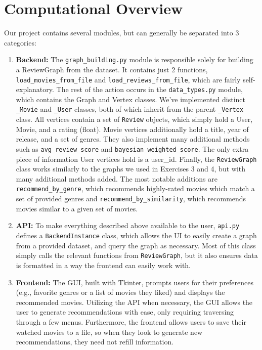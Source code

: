 \documentclass[12pt]{article}
\begin{document}
\section{Computational Overview}
Our project contains several modules, but can generally be separated into 3 categories:
\begin{enumerate}
    \item \textbf{Backend:} The \texttt{graph\_building.py} module is responsible solely for building a ReviewGraph from the dataset. It contains just 2 functions, \texttt{load\_movies\_from\_file} and \texttt{load\_reviews\_from\_file}, which are fairly self-explanatory. The rest of the action occurs in the \texttt{data\_types.py} module, which contains the Graph and Vertex classes. We've implemented distinct \texttt{\_Movie} and \texttt{\_User} classes, both of which inherit from the parent \texttt{\_Vertex} class. All vertices contain a set of \texttt{Review} objects, which simply hold a User, Movie, and a rating (float). Movie vertices additionally hold a title, year of release, and a set of genres. They also implement many additional methods such as \texttt{avg\_review\_score} and  \texttt{bayesian\_weighted\_score}. The only extra piece of information User vertices hold is a user\_id. Finally, the \texttt{ReviewGraph} class works similarly to the graphs we used in Exercises 3 and 4, but with many additional methods added. The most notable additions are \texttt{recommend\_by\_genre}, which recommends highly-rated movies which match a set of provided genres and \texttt{recommend\_by\_similarity}, which recommends movies similar to a given set of movies.
    \item \textbf{API:} To make everything described above available to the user, \texttt{api.py} defines a \texttt{BackendInstance} class, which allows the UI to easily create a graph from a provided dataset, and query the graph as necessary. Most of this class simply calls the relevant functions from \texttt{ReviewGraph}, but it also ensures data is formatted in a way the frontend can easily work with.
    \item \textbf{Frontend:} The GUI, built with Tkinter, prompts users for their preferences (e.g., favorite genres or a list of movies they liked) and displays the recommended movies. Utilizing the API when necessary, the GUI allows the user to generate recommendations with ease, only requiring traversing through a few menus. Furthermore, the frontend allows users to save their watched movies to a file, so when they look to generate new recommendations, they need not refill information.
\end{enumerate}
\end{document}
